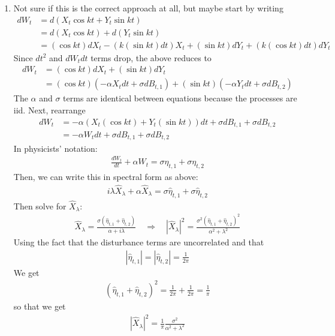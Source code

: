 \documentclass[12pt]{article}
\theoremstyle{plain}
\theoremstyle{definition}
\theoremstyle{remark}
\begin{document}
\begin{enumerate}
\begin{enumerate}
      \item %
        Not sure if this is the correct approach at all, but maybe start
        by writing
        \begin{align*}
          dW_t &= d\left( X_t\cos kt + Y_t\sin kt\right) \\
               &= d\left( X_t\cos kt\right) + d\left(Y_t\sin kt\right) \\
          &= (\cos kt) dX_t - (k (\sin kt) dt) X_t
              + (\sin kt) dY_t + (k(\cos kt) dt)dY_t
        \end{align*}
        Since $dt^2$ and $dW_t dt$ terms drop, the above reduces to
        \begin{align*}
          dW_t
          &= (\cos kt) dX_t + (\sin kt) dY_t\\
          &= (\cos kt) \left( -\alpha X_t dt + \sigma dB_{t,1} \right)
          + (\sin kt)\left( -\alpha Y_t dt + \sigma dB_{t,2}\right)
        \end{align*}
        The $\alpha$ and $\sigma$ terms are identical between equations
        because the processes are iid. Next, rearrange
        \begin{align*}
          dW_t
          &= -\alpha  \left(X_t (\cos kt) + Y_t(\sin kt) \right)dt + \sigma dB_{t,1} + \sigma dB_{t,2}\\
          &= -\alpha  W_t dt + \sigma dB_{t,1} + \sigma dB_{t,2}
        \end{align*}
        In physicists' notation:
        \begin{align*}
          \frac{dW_t}{dt} + \alpha  W_t
          = \sigma \eta_{t,1} + \sigma \eta_{t,2}
        \end{align*}
        Then, we can write this in spectral form as above:
        \begin{align*}
          i\lambda \hat{X}_\lambda + \alpha  \hat{X}_\lambda
          = \sigma \hat{\eta}_{t,1} + \sigma \hat{\eta}_{t,2}
        \end{align*}
        Then solve for $\hat{X}_\lambda$:
        \begin{align*}
          \hat{X}_\lambda =
          \frac{\sigma (\hat{\eta}_{t,1} + \hat{\eta}_{t,2})}{\alpha + i\lambda}
          \quad\Rightarrow\quad
          |\hat{X}_\lambda|^2 =
          \frac{\sigma^2 (\hat{\eta}_{t,1} + \hat{\eta}_{t,2})^2}{\alpha^2 + \lambda^2}
        \end{align*}
        Using the fact that the disturbance terms are uncorrelated and
        that
        \begin{align*}
          |\hat{\eta}_{t,1}|=|\hat{\eta}_{t,2}|=\frac{1}{2\pi}
        \end{align*}
        We get
        \begin{align*}
          (\hat{\eta}_{t,1}+\hat{\eta}_{t,2})^2 = \frac{1}{2\pi}+\frac{1}{2\pi} = \frac{1}{\pi}
        \end{align*}
        so that we get
        \begin{align*}
          |\hat{X}_\lambda|^2 =
          \frac{1}{\pi}
          \frac{\sigma^2}{\alpha^2 + \lambda^2}
        \end{align*}


\end{enumerate}
\end{enumerate}
\end{document}
